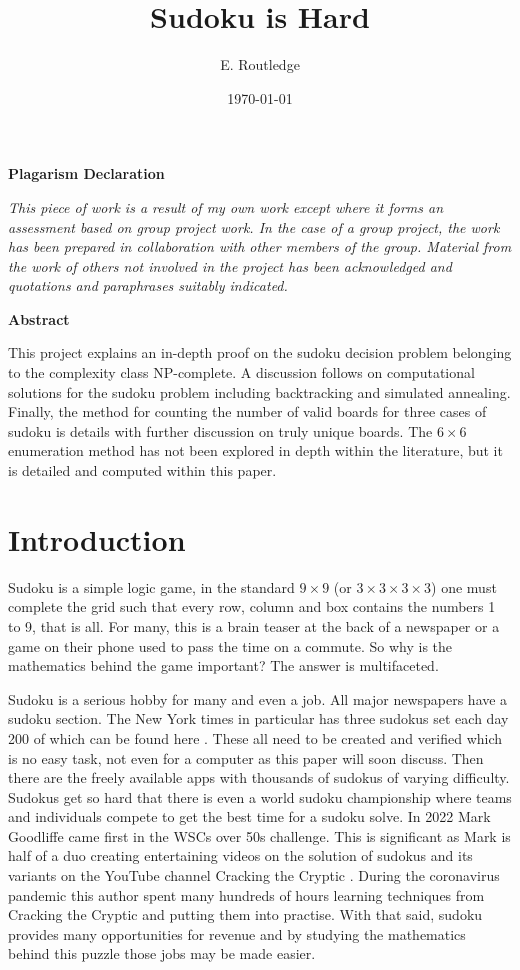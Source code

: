 \documentclass[a4paper,11pt]{report}
\author{E. Routledge}
\date{\today}
\title{Sudoku is Hard}
\newcounter{row}
\newcounter{col}
\begin{document}
\lstset{language=Python}

\begin{center}{\huge\textbf{Plagarism Declaration}}\end{center}
\textit{This piece of work is a result of my own work except where it forms an assessment based on group project work. In the case of a group project, the work has been prepared in collaboration with other members of the group. Material from the work of others not involved in the project has been acknowledged and quotations and paraphrases suitably indicated.}
\begin{center}{\textbf{Abstract}}\end{center}
This project explains an in-depth proof on the sudoku decision problem belonging to the complexity class NP-complete. A discussion follows on computational solutions for the sudoku problem including backtracking and simulated annealing. Finally, the method for counting the number of valid boards for three cases of sudoku is details with further discussion on truly unique boards. The $6\times 6$ enumeration method has not been explored in depth within the literature, but it is detailed and computed within this paper.

\tableofcontents
\chapter{Introduction}

Sudoku is a simple logic game, in the standard $9 \times 9$ (or $3 \times 3 \times 3 \times 3$) one must complete the grid such that every row, column and box contains the numbers 1 to 9, that is all. For many, this is a brain teaser at the back of a newspaper or a game on their phone used to pass the time on a commute. So why is the mathematics behind the game important? The answer is multifaceted. 

Sudoku is a serious hobby for many and even a job. All major newspapers have a sudoku section. The New York times in particular has three sudokus set each day 200 of which can be found here \cite{Shortz2006}. These all need to be created and verified which is no easy task, not even for a computer as this paper will soon discuss. Then there are the freely available apps with thousands of sudokus of varying difficulty. Sudokus get so hard that there is even a world sudoku championship \cite{sudokuworldchampionship} where teams and individuals compete to get the best time for a sudoku solve. In 2022 Mark Goodliffe came first in the WSCs over 50s challenge. This is significant as Mark is half of a duo creating entertaining videos on the solution of sudokus and its variants on the YouTube channel Cracking the Cryptic \cite{crackingthecryptic}. During the coronavirus pandemic this author spent many hundreds of hours learning techniques from Cracking the Cryptic and putting them into practise. With that said, sudoku provides many opportunities for revenue and by studying the mathematics behind this puzzle those jobs may be made easier.
\end{document}
